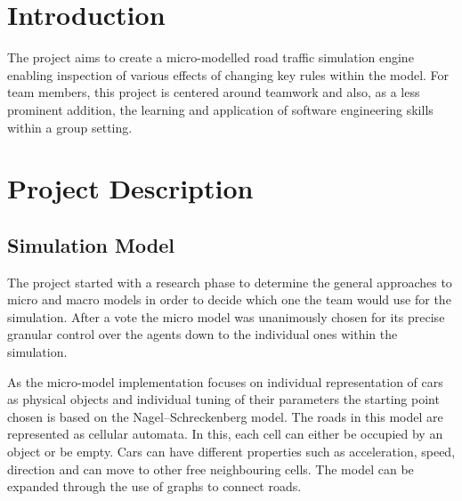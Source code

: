 
\section{Introduction}

The project aims to create a micro-modelled road traffic simulation engine enabling inspection of various effects of changing key rules within the model. For team members, this project is centered around teamwork and also, as a less prominent addition, the learning and application of software engineering skills within a group setting.

\section{Project Description} %

\subsection{Simulation Model}
The project started with a research phase to determine the general approaches to micro and macro models in order to decide which one the team would use for the simulation. After a vote the micro model was unanimously chosen for its precise granular control over the agents down to the individual ones within the simulation.

\vspace{3mm}

As the micro-model implementation focuses on individual representation of cars as physical objects and individual tuning of their parameters the starting point chosen is based on the Nagel–Schreckenberg model. The roads in this model are represented as cellular automata\cite{Schreckenberg}. In this, each cell can either be occupied by an object or be empty. Cars can have different properties such as acceleration, speed, direction and can move to other free neighbouring cells. The model can be expanded through the use of graphs to connect roads.


